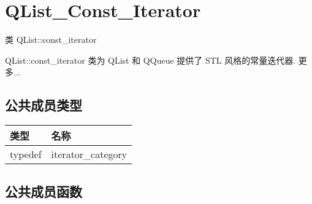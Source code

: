 \chapter{QList\_Const\_Iterator}

类 QList::const\_iterator

QList::const\_iterator 类为 QList 和 QQueue 提供了 STL 风格的常量迭代器.
更多...

\section{公共成员类型}

\begin{tabular}{|l|l|}
\hline
类型 &	名称\\
\hline
typedef &	iterator\_category\\
\hline
\end{tabular}

\section{公共成员函数}

